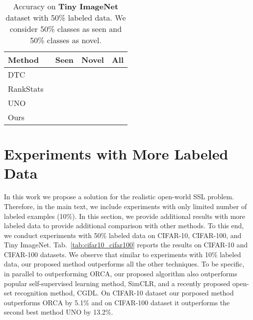 \documentclass[runningheads]{eccv2022submission}
\begin{document}
\begin{table}[h]
\caption{Accuracy on \textbf{Tiny ImageNet}  dataset with  50\% labeled data. We consider 50\% classes as seen and 50\% classes as novel.}
\label{tab:cifar100}
\begin{center}\setlength{\tabcolsep}{4pt}
\small
\begin{tabular}{lccc}
\hline

\textbf{Method}  & \textbf{Seen} & \textbf{Novel} & \textbf{All}\\




\hline
DTC~\cite{han2019learning} &  &  & \\
RankStats~\cite{Han2020Automatically} & &  & \\
UNO~\cite{fini2021unified} &   &  & \\
Ours & {\cellcolor{yellow!15}} & {\cellcolor{yellow!15}} & {\cellcolor{yellow!15}}\\\hline 



\end{tabular}
\end{center}
\vspace{-4mm}

\end{table}


\section{Experiments with More Labeled Data}
\label{sec:morelabeled}
In this work we propose a solution for the realistic open-world SSL problem. Therefore, in the main text, we include experiments with only limited number of labeled examples (10\%). In this section, we provide additional results with more labeled data to provide additional comparison with other methods. To this end, we conduct experiments with 50\% labeled data on CIFAR-10, CIFAR-100, and Tiny ImageNet. Tab.~\ref{tab:cifar10_cifar100} reports the results on CIFAR-10 and CIFAR-100 datasets. We observe that similar to experiments with 10\% labeled data, our proposed method outperforms all the other techniques. To be specific, in parallel to outperforming ORCA\cite{cao2022openworld}, our proposed algorithm also outperforms popular self-supervised learning method, SimCLR\cite{chen2020simple}, and a recently proposed open-set recognition method, CGDL\cite{sun2020conditional}. On CIFAR-10 dataset our porposed method outperforms ORCA\cite{cao2022openworld} by 5.1\% and on CIFAR-100 dataset it outperforms the second best method UNO\cite{fini2021unified} by 13.2\%.
\end{document}
